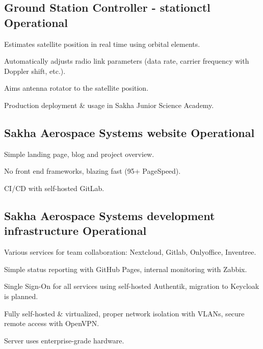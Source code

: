 \documentclass[letter,10pt]{article}
\begin{document}
\subsection{{Ground Station Controller - stationctl \hfill Operational}}
\begin{zitemize}
\item Estimates satellite position in real time using orbital elements.
\item Automatically adjusts radio link parameters (data rate, carrier frequency with Doppler shift, etc.).
\item Aims antenna rotator to the satellite position.
\item Production deployment \& usage in Sakha Junior Science Academy.
\end{zitemize}

\subsection{{Sakha Aerospace Systems website \hfill Operational}}
\begin{zitemize}
\item Simple landing page, blog and project overview.
\item No front end frameworks, blazing fast (95+ PageSpeed).
\item CI/CD with self-hosted GitLab.
\end{zitemize}

\subsection{{Sakha Aerospace Systems development infrastructure \hfill Operational}}
\begin{zitemize}
\item Various services for team collaboration: Nextcloud, Gitlab, Onlyoffice, Inventree.
\item Simple status reporting with GitHub Pages, internal monitoring with Zabbix.
\item Single Sign-On for all services using self-hosted Authentik, migration to Keycloak is planned.
\item Fully self-hosted \& virtualized, proper network isolation with VLANs, secure remote access with OpenVPN.
\item Server uses enterprise-grade hardware.
\end{zitemize}
\end{document}
